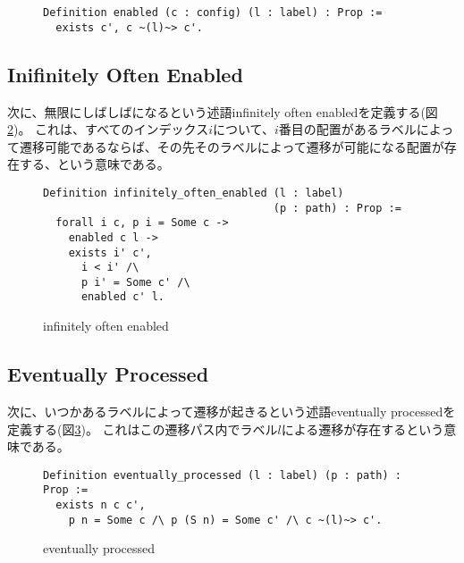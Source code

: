 \begin{figure}[tp]
\begin{lstlisting}
Definition enabled (c : config) (l : label) : Prop :=
  exists c', c ~(l)~> c'.
\end{lstlisting}
  \label{code:formalization:enabled}
  \caption{\enabled}
\end{figure}

\subsection{Inifinitely Often Enabled}
次に、無限にしばしば\enabled になるという述語infinitely often enabledを定義する(図\ref{code:proof:infinitely-often-enabled})。
これは、すべてのインデックス$i$について、$i$番目の配置があるラベルによって遷移可能であるならば、その先そのラベルによって遷移が可能になる配置が存在する、という意味である。

\begin{figure}
\begin{lstlisting}
Definition infinitely_often_enabled (l : label)
                                    (p : path) : Prop :=
  forall i c, p i = Some c ->
    enabled c l ->
    exists i' c',
      i < i' /\
      p i' = Some c' /\
      enabled c' l.
\end{lstlisting}
\label{code:proof:infinitely-often-enabled}
\caption{infinitely often enabled}
\end{figure}

\subsection{Eventually Processed}
次に、いつかあるラベルによって遷移が起きるという述語eventually processedを定義する(図\ref{code:proof:eventually-processed})。
これはこの遷移パス内でラベル$l$による遷移が存在するという意味である。

\begin{figure}
\begin{lstlisting}
Definition eventually_processed (l : label) (p : path) : Prop :=
  exists n c c',
    p n = Some c /\ p (S n) = Some c' /\ c ~(l)~> c'.
\end{lstlisting}
\label{code:proof:eventually-processed}
\caption{eventually processed}
\end{figure}


